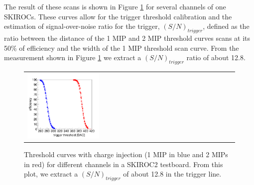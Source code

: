 \documentclass[final,3p,times,twocolumn]{elsarticle}
\begin{document}
The result of these scans is shown in Figure \ref{scurves_injection} for several channels of one SKIROCs.
These curves allow for the trigger threshold calibration and the
estimation of signal-over-noise ratio for the trigger, $(S/N)_{trigger}$, defined as the ratio between the distance of the
1 MIP and 2 MIP threshold curves scans at its 50\% of efficiency and the width of the 1 MIP threshold scan curve.
From the measurement shown in Figure \ref{scurves_injection} we extract a $(S/N)_{trigger}$ ratio of about 12.8.

\begin{figure}[h!t]
    \centering
  \begin{tabular}{l}
	\includegraphics[width=0.35\textwidth]{scurve_pp_fastshaper_ch_DAC-eps-converted-to.pdf} \\
	\end{tabular}
\caption{Threshold curves with charge injection (1 MIP in blue and 2 MIPs in red) for different channels in a SKIROC2 testboard. From this plot, we extract a $(S/N)_{trigger}$ of about 12.8 in the trigger line.}
\label{scurves_injection}
\end{figure}
\end{document}
